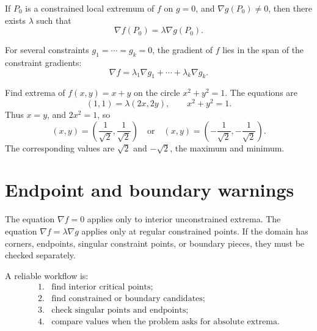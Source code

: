 \begin{theorem}
If \(P_0\) is a constrained local extremum of \(f\) on \(g=0\), and \(\nabla g(P_0)\ne0\), then there exists \(\lambda\) such that
\[
  \nabla f(P_0)=\lambda\nabla g(P_0).
\]
\end{theorem}

For several constraints \(g_1=\cdots=g_k=0\), the gradient of \(f\) lies in the span of the constraint gradients:
\[
  \nabla f=\lambda_1\nabla g_1+\cdots+\lambda_k\nabla g_k.
\]

\begin{example}
Find extrema of \(f(x,y)=x+y\) on the circle \(x^2+y^2=1\).  The equations are
\[
  (1,1)=\lambda(2x,2y),
  \qquad x^2+y^2=1.
\]
Thus \(x=y\), and \(2x^2=1\), so
\[
  (x,y)=\left(\frac1{\sqrt2},\frac1{\sqrt2}\right)
  \quad\text{or}\quad
  (x,y)=\left(-\frac1{\sqrt2},-\frac1{\sqrt2}\right).
\]
The corresponding values are \(\sqrt2\) and \(-\sqrt2\), the maximum and minimum.
\end{example}

\section{Endpoint and boundary warnings}

The equation \(\nabla f=0\) applies only to interior unconstrained extrema.  The equation \(\nabla f=\lambda\nabla g\) applies only at regular constrained points.  If the domain has corners, endpoints, singular constraint points, or boundary pieces, they must be checked separately.

A reliable workflow is:
\[
\begin{array}{ll}
1. & \text{find interior critical points;}\\
2. & \text{find constrained or boundary candidates;}\\
3. & \text{check singular points and endpoints;}\\
4. & \text{compare values when the problem asks for absolute extrema.}
\end{array}
\]
